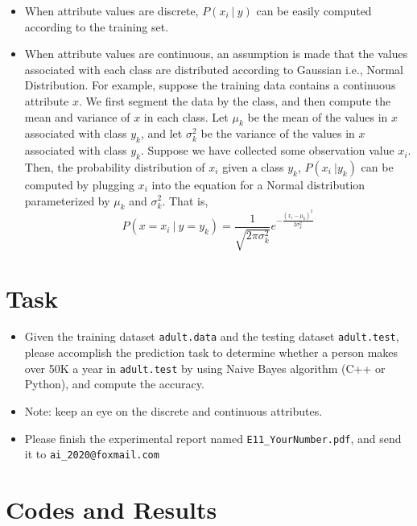\documentclass[a4paper, 11pt]{article}
\begin{document}
\begin{itemize}
	\item When attribute values are discrete, $P(x_i\ |\ y)$ can be easily computed according to the training set.
	\item When attribute values are continuous, an assumption is made that the values associated with each class are distributed according to Gaussian i.e., Normal Distribution. For example, suppose the training data contains a continuous attribute $x$. We first segment the data by the class, and then compute the mean and variance of $x$ in each class. Let $\mu_k$ be the mean of the values in $x$ associated with class $y_k$, and let $\sigma_k^2$ be the variance of the values in $x$ associated with class $y_k$. Suppose we have collected some observation value $x_i$. Then, the probability distribution of $x_i$ given a class $y_k$, $P(x_i\ | y_k)$ can be computed by plugging $x_i$ into the equation for a Normal distribution parameterized by $\mu_k$ and $\sigma_k^2$. That is,
	$$P(x=x_i\ |\ y=y_k)=\frac{1}{\sqrt{2\pi\sigma_k^2}}e^{-\frac{(x_i-\mu_k)^2}{2\sigma_k^2}}$$
    
\end{itemize}

\section{Task}
\begin{itemize}
\item Given the training dataset \texttt{adult.data} and the testing dataset \texttt{adult.test}, please accomplish the prediction task to determine whether a person makes over 50K a year in \texttt{adult.test} by using Naive Bayes algorithm (C++ or Python), and compute the accuracy. 
\item Note: keep an eye on the discrete and continuous attributes.
\item Please finish the experimental report named \texttt{E11\_YourNumber.pdf}, and send it to \texttt{ai\_2020@foxmail.com}
\end{itemize}

\section{Codes and Results}


%
%
\end{document}
